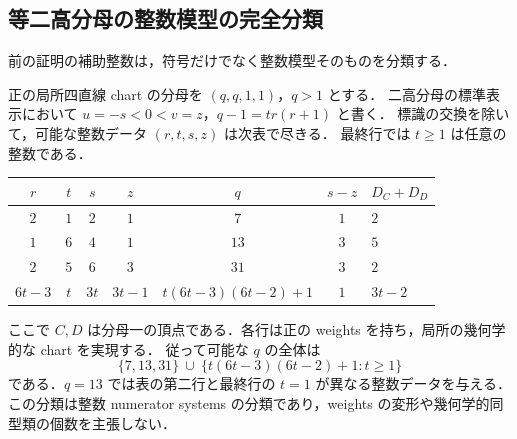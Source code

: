 
\subsection{等二高分母の整数模型の完全分類}
\label{uc11:classification-section}

前の証明の補助整数は，符号だけでなく整数模型そのものを分類する．

\begin{theorem}\label{uc11:classification}
正の局所四直線 chart の分母を $(q,q,1,1)$，$q>1$ とする．
二高分母の標準表示において $u=-s<0<v=z$，$q-1=tr(r+1)$ と書く．
標識の交換を除いて，可能な整数データ $(r,t,s,z)$ は次表で尽きる．
最終行では $t\geq1$ は任意の整数である．
\begin{center}
\small
\begin{tabular}{ccccccl}
$r$ & $t$ & $s$ & $z$ & $q$ & $s-z$ & $D_C+D_D$ \\
\hline
$2$ & $1$ & $2$ & $1$ & $7$ & $1$ & $2$ \\
$1$ & $6$ & $4$ & $1$ & $13$ & $3$ & $5$ \\
$2$ & $5$ & $6$ & $3$ & $31$ & $3$ & $2$ \\
$6t-3$ & $t$ & $3t$ & $3t-1$ & $t(6t-3)(6t-2)+1$ & $1$ & $3t-2$
\end{tabular}
\end{center}
ここで $C,D$ は分母一の頂点である．各行は正の weights を持ち，局所の幾何学的な chart を実現する．
従って可能な $q$ の全体は
\[
 \{7,13,31\}\ \cup\
 \{t(6t-3)(6t-2)+1:t\geq1\}
\]
である．$q=13$ では表の第二行と最終行の $t=1$ が異なる整数データを与える．
この分類は整数 numerator systems の分類であり，weights の変形や幾何学的同型類の個数を主張しない．
\end{theorem}

